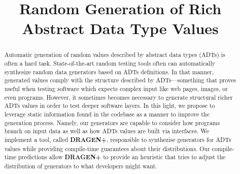 \documentclass[conference, fleqn]{IEEEtran}
\newcommand{\dragenp}{\textbf{DRAGEN\!+}\xspace}
\begin{document}
\title{Random Generation of Rich \\ Abstract Data Type Values }

\author{
\and
{}
}

\maketitle


\begin{abstract}

  Automatic generation of random values described by abstract data types (ADTs)
  is often a hard task.
  State-of-the-art random testing tools often can automatically synthesize
  random data generators based on ADTs definitions.
  In that manner, generated values comply with the structure described by
  ADTs---something that proves useful when testing software which expects
  complex input like web pages, images, or even programs.
  However, it sometimes becomes necessary to generate structural richer ADTs
  values in order to test deeper software layers.
  In this light, we propose to leverage static information found in the
  codebase as a manner to improve the generation process.
  Namely, our generators are capable to consider how programs branch on input
  data as well as how ADTs values are built via interfaces.
  We implement a tool, called {\dragenp}, responsible to synthezise generators
  for ADTs values while providing compile-time guarantees about their
  distributions.
  Our compile-time predictions allow {\dragenp} to provide an heuristic that
  tries to adjust the distribution of generators to what developers might want.

\end{abstract}
\end{document}
